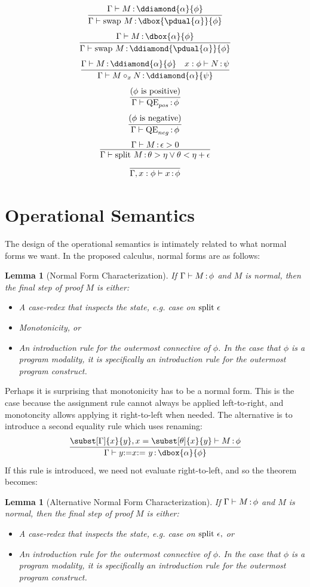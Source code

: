 \documentclass[12pt]{cmuthesis}
\newtheorem{lemma}[theorem]{Lemma}
\theoremstyle{definition}
\theoremstyle{remark}
\begin{document}
\[\infer{\proves{\G}{\eswap{M}}{\dbox{\pdual{\alpha}}{\phi}}}
        {\proves{\G}{M}{\ddiamond{\alpha}{\phi}}}\]
\[\infer{\proves{\G}{\eswap{M}}{\ddiamond{\pdual{\alpha}}{\phi}}}
        {\proves{\G}{M}{\dbox{\alpha}{\phi}}}\]
\[\infer{\proves{\G}{\emon{M}{N}{x}}{\ddiamond{\alpha}{\psi}}}
        {\proves{\G}{M}{\ddiamond{\alpha}{\phi}} & \proves{x:\phi}{N}{\psi}}\]
\[\infer{\proves{\G}{\eQEpos}{\phi}}{\text{($\phi$ is positive)}}\]
\[\infer{\proves{\G}{\eQEneg}{\phi}}{\text{($\phi$ is negative)}}\]
\[\infer{\proves{\G}{\esplit{M}}{\theta > \eta \lor \theta < \eta + \epsilon}}
        {\proves{\G}{M}{\epsilon > 0}}\]
\[\infer{\proves{\G,x:\phi}{x}{\phi}}{}\]

\section{Operational Semantics}
The design of the operational semantics is intimately related to what normal forms we want.
In the proposed calculus, normal forms are as follows:
\begin{lemma}[Normal Form Characterization]
\label{lem:normal-forms}
If $\Gamma \vdash M\mathop{:}\phi$ and $M$ is normal, then the final step of proof $M$ is either:
\begin{itemize}
\item A case-redex that inspects the state, e.g. case on $\textrm{split }\epsilon$
\item Monotonicity, or
\item An introduction rule for the outermost connective of $\phi$.
       In the case that $\phi$ is a program modality, it is specifically an introduction rule for the outermost program construct.
\end{itemize}
\end{lemma}
Perhaps it is surprising that monotonicity has to be a normal form.
This is the case because the assignment rule cannot always be applied left-to-right, and monotoncity allows applying it right-to-left when needed.
The alternative is to introduce a second equality rule which uses renaming:
\[\infer{\proves{\G}{\easgneq{y}{x}{M}}{\dbox{\alpha}{\phi}}}
          {\proves{\subst[\G]{x}{y},x=\subst[\theta]{x}{y}}{M}{\phi}}\]
If this rule is introduced, we need not evaluate right-to-left, and so the theorem becomes:
\begin{lemma}[Alternative Normal Form Characterization]
\label{lem:normal-forms-alt}
If $\Gamma \vdash M\mathop{:}\phi$ and $M$ is normal, then the final step of proof $M$ is either:
\begin{itemize}
\item A case-redex that inspects the state, e.g. case on $\textrm{split }\epsilon,$ or
\item An introduction rule for the outermost connective of $\phi$.
       In the case that $\phi$ is a program modality, it is specifically an introduction rule for the outermost program construct.
\end{itemize}
\end{lemma}
\end{document}
